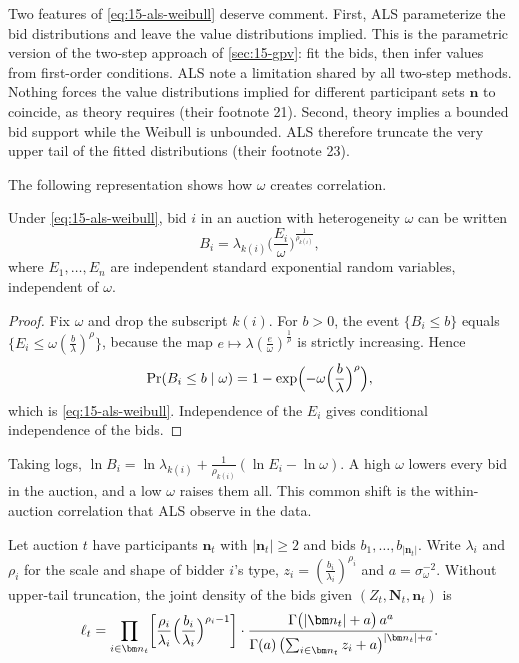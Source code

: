 Two features of \eqref{eq:15-als-weibull} deserve comment. First, ALS parameterize the bid distributions and
leave the value distributions implied. This is the parametric version of the two-step approach of \cref{sec:15-gpv}:
fit the bids, then infer values from first-order conditions. ALS note a limitation shared by all two-step
methods. Nothing forces the value distributions implied for different participant sets $\bm n$ to
coincide, as theory requires (their footnote 21). Second, theory implies a bounded bid support while the
Weibull is unbounded. ALS therefore truncate the very upper tail of the fitted distributions (their
footnote 23).

The following representation shows how $\omega$ creates correlation.

\begin{lemma}\label{lem:15-als-rep}
Under \eqref{eq:15-als-weibull}, bid $i$ in an auction with heterogeneity $\omega$ can be written
\[
B_i=\lambda_{k(i)}\biggl(\frac{E_i}{\omega}\biggr)^{\frac{1}{\rho_{k(i)}}},
\]
where $E_1,\dots,E_n$ are independent standard exponential random variables, independent of $\omega$.
\end{lemma}

\begin{proof}
Fix $\omega$ and drop the subscript $k(i)$. For $b>0$, the event $\{B_i\le b\}$ equals $\{E_i\le
\omega(\frac{b}{\lambda})^{\rho}\}$, because the map $e\mapsto\lambda(\frac{e}{\omega})^{\frac1\rho}$ is
strictly increasing. Hence
\[
\Pr(B_i\le b\mid\omega)=1-\exp\Bigl(-\omega\Bigl(\frac{b}{\lambda}\Bigr)^{\rho}\Bigr),
\]
which is \eqref{eq:15-als-weibull}. Independence of the $E_i$ gives conditional independence of the bids.
\end{proof}

Taking logs, $\ln B_i=\ln\lambda_{k(i)}+\frac{1}{\rho_{k(i)}}(\ln E_i-\ln\omega)$. A high $\omega$ lowers
every bid in the auction, and a low $\omega$ raises them all. This common shift is the within-auction
correlation that ALS observe in the data.

\begin{proposition}\label{prop:15-als-lik}
Let auction $t$ have participants $\bm n_t$ with $|\bm n_t|\ge2$ and bids $b_1,\dots,b_{|\bm n_t|}$. Write
$\lambda_i$ and $\rho_i$ for the scale and shape of bidder $i$'s type, $z_i=(\frac{b_i}{\lambda_i})^{\rho_i}$
and $a=\sigma_\omega^{-2}$. Without upper-tail truncation, the joint density of the bids given
$(Z_t,\bm N_t,\bm n_t)$ is
\begin{equation}\label{eq:15-als-lik}
\ell_t=\prod_{i\in\bm n_t}\biggl[\frac{\rho_i}{\lambda_i}\Bigl(\frac{b_i}{\lambda_i}\Bigr)^{\rho_i-1}\biggr]\cdot
\frac{\Gamma\bigl(|\bm n_t|+a\bigr)\,a^{a}}{\Gamma(a)\,\bigl(\sum_{i\in\bm n_t}z_i+a\bigr)^{|\bm n_t|+a}} .
\end{equation}
\end{proposition}

